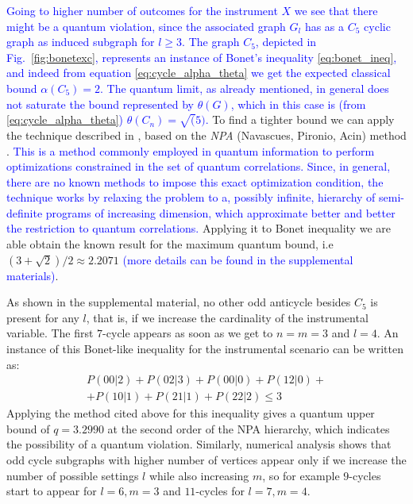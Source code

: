 \documentclass[letterpaper]{article}
\begin{document}
\textcolor{blue}{
Going to higher number of outcomes for the instrument $X$ we see that
there might be a quantum violation, since the associated graph $G_l$
has as a $C_5$ cyclic graph as induced subgraph for $l \ge 3$.
The graph $C_5$, depicted in Fig.~\ref{fig:bonetexc},
represents an instance of Bonet's inequality \eqref{eq:bonet_ineq}, and indeed from
equation \eqref{eq:cycle_alpha_theta} we get the expected classical
bound $\alpha(C_5)=2$.
The quantum limit, as already mentioned, in general does not saturate the
bound represented by $\theta(G)$, which in this case is (from \eqref{eq:cycle_alpha_theta})
$\theta(C_n) = \sqrt(5)$.
}
To find a tighter bound we can apply the technique described in
\cite{rabelo2014}, based on the \emph{NPA} (Navascues, Pironio, Acin) method \cite{npa2008}.
\textcolor{blue}{
This is a method commonly employed in quantum information to perform optimizations constrained in the set of quantum correlations. Since, in general, there are no known methods to impose this exact optimization condition, the technique works by relaxing the problem to a, possibly infinite, hierarchy of semi-definite programs of increasing dimension, which approximate better and better the restriction to quantum correlations.
}
Applying it to Bonet inequality we are able obtain the known result for the
maximum quantum bound, i.e $(3+\sqrt{2})/2 \approx 2.2071$ \textcolor{blue}{(more
details can be found in the supplemental materials)}.

As shown in the supplemental material, no other odd anticycle besides
$C_5$ is present for any $l$, that is, if we increase the cardinality of the
instrumental variable. The first $7$-cycle appears as soon as we get to $n=m=3$ and $l=4$. 
An instance of this Bonet-like inequality for the instrumental scenario can be written as:
\begin{multline}
    P(00|2) + P(02|3) + P(00|0) + P(12|0) + \\
    + P(10|1) + P(21|1) + P(22|2) \le 3 
    \label{eq:c7_instrumental433}
\end{multline}
Applying the method cited above for this inequality gives a quantum upper bound
of $q = 3.2990$ at the second order of the NPA hierarchy, which indicates the
possibility of a quantum violation.
Similarly, numerical analysis shows that odd cycle subgraphs with higher number
of vertices appear only if we increase the number of possible settings $l$ while
also increasing $m$, so for example $9$-cycles start to appear for $l=6, m=3$ 
and $11$-cycles for $l=7, m=4$.
\end{document}
